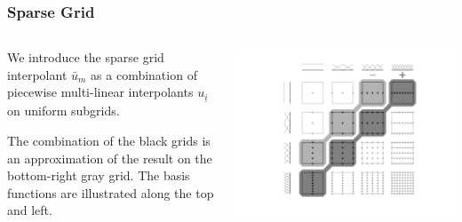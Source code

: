 \documentclass[11pt,ucs]{beamer}
\begin{document}
\begin{frame}\frametitle{Sparse Grid}

\begin{columns}
\begin{column}{0.4\textwidth}
We introduce the sparse grid interpolant $\bar u_m$ as a combination of piecewise multi-linear interpolants $u_{\underline{i}}$ on uniform subgrids.

\medskip
The combination of the black grids is an approximation of the result on the bottom-right gray grid. The basis functions are illustrated along the top and left.
\end{column}

\begin{column}{0.6\textwidth}

\centering
\includegraphics[width=1.1\textwidth]{combination_linear.png}


\end{column}

\end{columns}

\end{frame}
\end{document}
